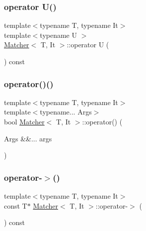 \mbox{\label{class_matcher_a0bd21eb19304624235c6cb208fa1216a}} 
\subsubsection{\texorpdfstring{operator U()}{operator U()}}
{\footnotesize\ttfamily template$<$typename T, typename It$>$ \\
template$<$typename U $>$ \\
\hyperlink{class_matcher}{Matcher}$<$ T, It $>$\+::operator U (\begin{DoxyParamCaption}{ }\end{DoxyParamCaption}) const\hspace{0.3cm}{\ttfamily [inline]}}

\mbox{\label{class_matcher_a2c1cbd69f6fcbbcf40e9e66333cfddca}} 
\subsubsection{\texorpdfstring{operator()()}{operator()()}}
{\footnotesize\ttfamily template$<$typename T, typename It$>$ \\
template$<$typename... Args$>$ \\
bool \hyperlink{class_matcher}{Matcher}$<$ T, It $>$\+::operator() (\begin{DoxyParamCaption}\item[{Args \&\&...}]{args }\end{DoxyParamCaption})\hspace{0.3cm}{\ttfamily [inline]}}

\mbox{\label{class_matcher_a3613bf19482915302d6647e25d9facb2}} 
\subsubsection{\texorpdfstring{operator-\/$>$()}{operator->()}}
{\footnotesize\ttfamily template$<$typename T, typename It$>$ \\
const T$\ast$ \hyperlink{class_matcher}{Matcher}$<$ T, It $>$\+::operator-\/$>$ (\begin{DoxyParamCaption}{ }\end{DoxyParamCaption}) const\hspace{0.3cm}{\ttfamily [inline]}}

